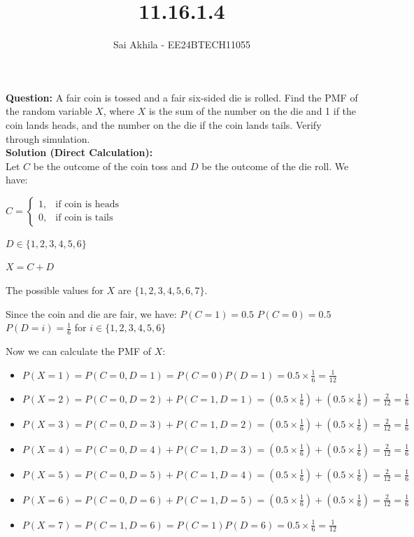 \documentclass[journal]{IEEEtran}
\begin{document}

\vspace{3cm}

\title{11.16.1.4}
\author{Sai Akhila - EE24BTECH11055}

{\let\newpage\relax\maketitle}

\renewcommand{\thefigure}{\theenumi}
\renewcommand{\thetable}{\theenumi}
\setlength{\intextsep}{10pt}

\renewcommand{\thetable}{\theenumi}

\textbf{Question:} A fair coin is tossed and a fair six-sided die is rolled. Find the PMF of the random variable $X$, where $X$ is the sum of the number on the die and 1 if the coin lands heads, and the number on the die if the coin lands tails. Verify through simulation.\\

\textbf{Solution (Direct Calculation):}\\
Let $C$ be the outcome of the coin toss and $D$ be the outcome of the die roll. We have:

$C = \begin{cases} 1, & \text{if coin is heads} \\ 0, & \text{if coin is tails} \end{cases}$

$D \in \{1, 2, 3, 4, 5, 6\}$

$X = C + D$

The possible values for $X$ are $\{1, 2, 3, 4, 5, 6, 7\}$.

Since the coin and die are fair, we have:
$P(C=1) = 0.5$
$P(C=0) = 0.5$
$P(D=i) = \frac{1}{6}$ for $i \in \{1, 2, 3, 4, 5, 6\}$

Now we can calculate the PMF of $X$:
\begin{itemize}
    \item $P(X=1) = P(C=0, D=1) = P(C=0)P(D=1) = 0.5 \times \frac{1}{6} = \frac{1}{12}$
    \item $P(X=2) = P(C=0, D=2) + P(C=1, D=1) = (0.5 \times \frac{1}{6}) + (0.5 \times \frac{1}{6}) = \frac{2}{12} = \frac{1}{6}$
    \item $P(X=3) = P(C=0, D=3) + P(C=1, D=2) = (0.5 \times \frac{1}{6}) + (0.5 \times \frac{1}{6}) = \frac{2}{12} = \frac{1}{6}$
    \item $P(X=4) = P(C=0, D=4) + P(C=1, D=3) = (0.5 \times \frac{1}{6}) + (0.5 \times \frac{1}{6}) = \frac{2}{12} = \frac{1}{6}$
    \item $P(X=5) = P(C=0, D=5) + P(C=1, D=4) = (0.5 \times \frac{1}{6}) + (0.5 \times \frac{1}{6}) = \frac{2}{12} = \frac{1}{6}$
    \item $P(X=6) = P(C=0, D=6) + P(C=1, D=5) = (0.5 \times \frac{1}{6}) + (0.5 \times \frac{1}{6}) = \frac{2}{12} = \frac{1}{6}$
    \item $P(X=7) = P(C=1, D=6) = P(C=1)P(D=6) = 0.5 \times \frac{1}{6} = \frac{1}{12}$
\end{itemize}
\end{document}
